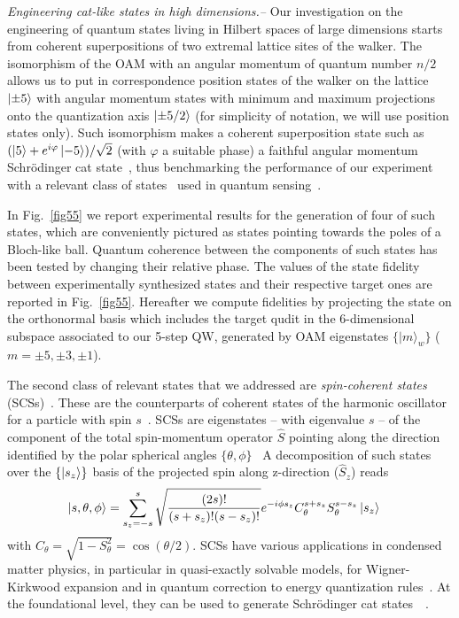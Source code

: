 \textit{Engineering cat-like states in high dimensions.--} Our investigation on the engineering of quantum states living in Hilbert spaces of large dimensions starts from coherent superpositions of two extremal lattice sites of the walker. The isomorphism of the OAM with an angular momentum of quantum number $n/2$ allows us to put in correspondence position states of the walker on the lattice $\ket{\pm 5}$ with angular momentum states with minimum and maximum projections onto the quantization axis $\ket{\pm 5/2}$ (for simplicity of notation, we will use position states only). Such isomorphism makes a coherent superposition state such as $(\ket{5}+e^{i\varphi}\ket{-5})/\sqrt{2}$ (with $\varphi$ a suitable phase) a faithful angular momentum Schr\"odinger cat state~\cite{militello2006distilling}, thus benchmarking the performance of our experiment with a relevant class of states~\cite{chandrashekar2008optimizing,zhang2016creating,majury2016robust} used in quantum sensing~\cite{fickler2012quantum,dambrosio2013photonic}.

In Fig.~\ref{fig55} we report experimental results for the generation of four of such states, which are conveniently pictured as states pointing towards the poles of a Bloch-like ball. Quantum coherence between the components of such states has been tested by changing their relative phase. The values of the state fidelity between experimentally synthesized states and their respective target ones are reported in Fig.~\ref{fig55}. Hereafter we compute fidelities by projecting the state on the orthonormal basis which includes the target qudit in the 6-dimensional subspace associated to our 5-step \ac{QW}, generated by OAM eigenstates $\{|m\rangle_w\}$ ($m=\pm 5, \pm 3, \pm 1$).

The second class of relevant states that we addressed are \emph{spin-coherent states} (SCSs)~\cite{agarwal1997atomic}. These are the counterparts of coherent states of the harmonic oscillator for a particle with spin $s$~\cite{radcliffe1971some,arecchi1972atomic,agarwal1997atomic,markham2003classicality}. 
SCSs are eigenstates -- with eigenvalue $s$ -- of the component of the total spin-momentum operator $\hat{S}$ pointing along the direction identified by the polar spherical angles $\{ \theta, \phi \}$~\cite{arecchi1972atomic,agarwal1997atomic,ulyanov1999spin,lee2015visualizing} 
A decomposition of such states over the $\{\ket{s_z}\}$ basis of the projected spin along z-direction ($\hat{S}_z$) reads
\begin{equation}
\begin{aligned}
 \ket{s,\theta,\phi} &= \sum_{s_z=-s}^{s}\sqrt{\frac{(2s)!}{(s+s_z)!(s-s_z)!}} e^{-i\phi s_z} C_\theta^{s+s_z}
S_\theta^{s-s_z}\ket{s_z}
 \label{spin_coherent1}
\end{aligned}
   \end{equation}
with $C_\theta=\sqrt{1-S^2_\theta}=\cos(\theta/2)$. SCSs have various applications in condensed matter physics, in particular in quasi-exactly solvable models, for Wigner-Kirkwood expansion and in quantum correction to energy quantization rules~\cite{ulyanov1999spin}. At the foundational level, they can be used to generate Schr{\"o}dinger cat states~~\cite{agarwal1997atomic}. 

